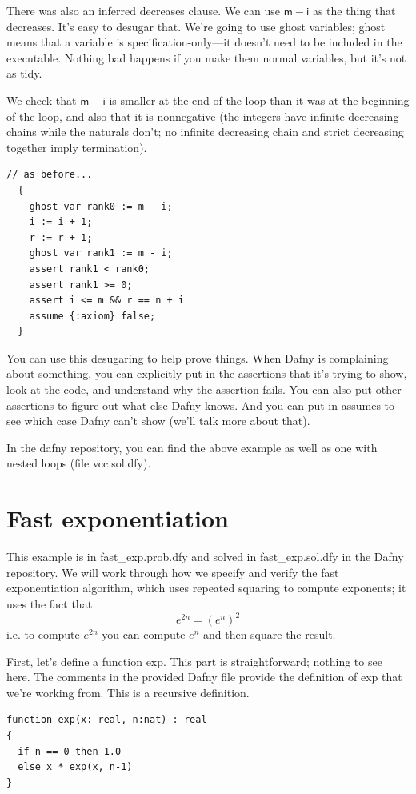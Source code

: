\documentclass[11pt]{article}
\begin{document}
There was also an inferred \textsf{decreases} clause. We can use $\mathsf{m}-\mathsf{i}$ as
the thing that decreases. It's easy to desugar that. We're going to use ghost variables; ghost means that a variable is
specification-only---it doesn't need to be included in the executable.
Nothing bad happens if you make them normal variables, but it's not as tidy.

We check that $\mathsf{m}-\mathsf{i}$ is smaller at the end of the loop than it was at the beginning of the loop,
and also that it is nonnegative (the integers have infinite decreasing chains while the naturals don't; no infinite
decreasing chain and strict decreasing together imply termination).

\begin{lstlisting}[language=dafny]
  // as before...
  {
    ghost var rank0 := m - i;
    i := i + 1;
    r := r + 1;
    ghost var rank1 := m - i;
    assert rank1 < rank0;
    assert rank1 >= 0;
    assert i <= m && r == n + i
    assume {:axiom} false;
  }
\end{lstlisting}

You can use this desugaring to help prove things. When Dafny is complaining about something, you
can explicitly put in the assertions that it's trying to show, look at the code, and understand why the
assertion fails. You can also put other assertions to figure out what else Dafny knows. And you can
put in assumes to see which case Dafny can't show (we'll talk more about that).

In the \textsf{dafny} repository, you can find the above example as well as one with nested loops
(file \textsf{vcc.sol.dfy}).

\section*{Fast exponentiation}

This example is in \textsf{fast\_exp.prob.dfy} and solved in \textsf{fast\_exp.sol.dfy} in the Dafny repository. We will work through how
we specify and verify the fast exponentiation algorithm, which uses repeated squaring to compute exponents; it uses the fact
that
\[ e^{2n} = (e^n)^2 \]
i.e. to compute $e^{2n}$ you can compute $e^n$ and then square the result.

First, let's define a function \textsf{exp}. This part is straightforward; nothing to see here. The comments in the provided Dafny file provide the definition of
\textsf{exp} that we're working from. This is a recursive definition.
\begin{lstlisting}[language=dafny]
function exp(x: real, n:nat) : real
{
  if n == 0 then 1.0
  else x * exp(x, n-1)
}
\end{lstlisting}
\end{document}
